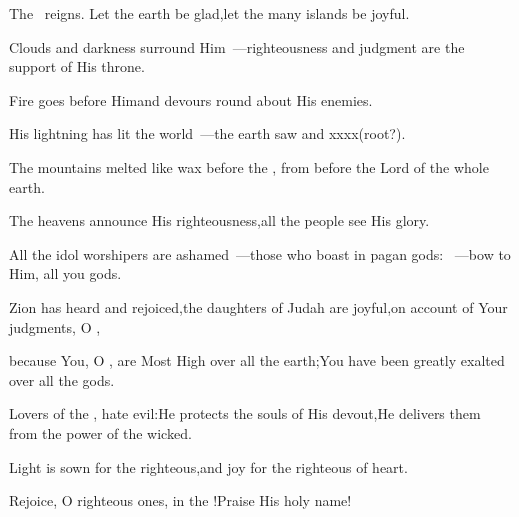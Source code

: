 
\begin{inparaenum}
  \pa {} The \lord\ reigns. Let the earth be glad,\pa let the many islands%
  be joyful.%
  
  \pa {} Clouds and darkness surround Him~---\pa righteousness and judgment are the support of His throne.%
  
  \pa {} Fire goes before Him\pa and devours round about His%
  enemies.%
  
  \pa {} His lightning has lit the world~---\pa the earth saw and xxxx(root?).%
  
  \pa {} The mountains melted like wax%
  before the \lord,%
  \pa from before%
  the Lord of the whole earth.%
  
  \pa {} The heavens announce His righteousness,\pa all the people see His glory.%
  
  \pa {} All the idol worshipers are ashamed~---\pa those who boast in pagan gods:%
  ~---\pa bow%
  to Him, all you gods.%
  
  \pa {} Zion has heard and rejoiced,\pa the daughters of Judah are joyful,\pa on account of Your judgments, O \lord,%
  
  \pa {} because You, O \lord,%
  are Most High over all the earth;\pa You have been greatly exalted over all the gods.%
  
  \pa {} Lovers of the \lord, hate evil:\pa He protects the souls of His devout,\pa He delivers them from the power of the wicked.%
  
  \pa {} Light is sown%
  for the righteous,\pa and joy for the righteous of heart.%
  
  \pa {} Rejoice, O righteous ones, in the \lord!\pa Praise His holy name!%
\end{inparaenum}
